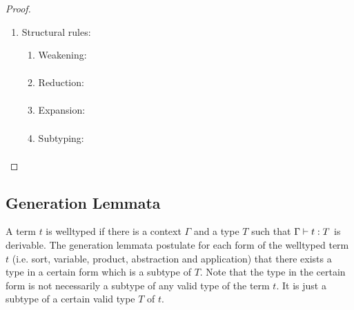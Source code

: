 \begin{lemma}
\begin{proof}
{\begin{enumerate}
\begin{enumerate}
                {\bf This proof might fail here.} There seems to be no
                possibility to prove $x \notin B$ and therefore it is
                questionable, if the induction hypotheses can be used. Without
                the induction hypotheses there seems to be no way to proof the
                desired result!!!


                INCOMPLETE!! POSSIBLY IMPOSSIBLE!!!

            \end{enumerate}
            \item Structural rules:
            \begin{enumerate}
                \item Weakening:
                $$
                \begin{array}{l|l}
                \end{array}
                $$

                \item Reduction:
                $$
                \begin{array}{l|l}
                \end{array}
                $$

                \item Expansion:
                $$
                \begin{array}{l|l}
                \end{array}
                $$

                \item Subtyping:
                $$
                \begin{array}{l|l}
                \end{array}
                $$

            \end{enumerate}
        \end{enumerate}
        }
    \end{proof}
\end{lemma}




\subsection{Generation Lemmata}

A term $t$ is welltyped if there is a context $\Gamma$ and a type $T$ such that
$\Gamma \vdash t: T$ is derivable. The generation lemmata postulate for each
form of the welltyped term $t$ (i.e. sort, variable, product, abstraction and
application) that there exists a type in a certain form which is a subtype of
$T$. Note that the type in the certain form is not necessarily a subtype of any
valid type of the term $t$. It is just a subtype of a certain valid type $T$ of
$t$.




